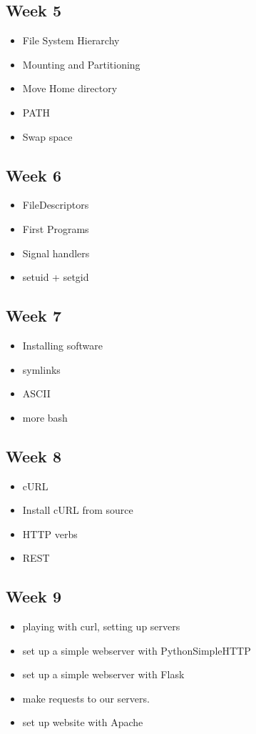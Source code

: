 \documentclass[11pt]{article}
\begin{document}
\subsection*{Week 5}
\begin{itemize}
	\item File System Hierarchy
	\item Mounting and Partitioning
	\item Move Home directory
	\item PATH
	\item Swap space
\end{itemize}

\subsection*{Week 6}
\begin{itemize}
	\item FileDescriptors
	\item First Programs
	\item Signal handlers
	\item setuid + setgid
\end{itemize}

\subsection*{Week 7}
\begin{itemize}
	\item Installing software
	\item symlinks
	\item ASCII
	\item more bash
\end{itemize}

\subsection*{Week 8}
\begin{itemize}
	\item cURL
	\item Install cURL from source
	\item HTTP verbs
	\item REST
\end{itemize}

\subsection*{Week 9}
\begin{itemize}
	\item playing with curl, setting up servers
	\item set up a simple webserver with PythonSimpleHTTP
	\item set up a simple webserver with Flask
	\item make requests to our servers.
	\item set up website with Apache
\end{itemize}
\end{document}
